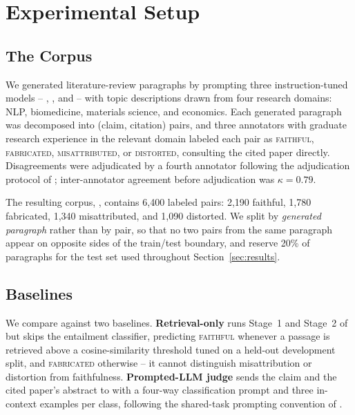 \section{Experimental Setup}

\subsection{The  Corpus}
\label{sec:data}

We generated literature-review paragraphs by prompting three
instruction-tuned models -- , ,
and  -- with topic descriptions drawn from four research
domains: NLP, biomedicine, materials science, and economics. Each generated
paragraph was decomposed into (claim, citation) pairs, and three annotators
with graduate research experience in the relevant domain labeled each pair
as \textsc{faithful}, \textsc{fabricated}, \textsc{misattributed}, or
\textsc{distorted}, consulting the cited paper directly. Disagreements were
adjudicated by a fourth annotator following the adjudication protocol of
\citet{winter2021adjudication}; inter-annotator agreement before
adjudication was $\kappa = 0.79$.

The resulting corpus, , contains 6,400 labeled pairs:
2,190 faithful, 1,780 fabricated, 1,340 misattributed, and 1,090 distorted.
We split by \emph{generated paragraph} rather than by pair, so that no two
pairs from the same paragraph appear on opposite sides of the train/test
boundary, and reserve 20\% of paragraphs for the test set used throughout
Section~\ref{sec:results}.

\subsection{Baselines}

We compare  against two baselines. \textbf{Retrieval-only}
runs Stage~1 and Stage~2 of  but skips the entailment
classifier, predicting \textsc{faithful} whenever a passage is retrieved
above a cosine-similarity threshold tuned on a held-out development split,
and \textsc{fabricated} otherwise -- it cannot distinguish misattribution or
distortion from faithfulness. \textbf{Prompted-LLM judge} sends the claim
and the cited paper's abstract to  with a four-way
classification prompt and three in-context examples per class, following
the shared-task prompting convention of \citet{nakamura2021survey}.


